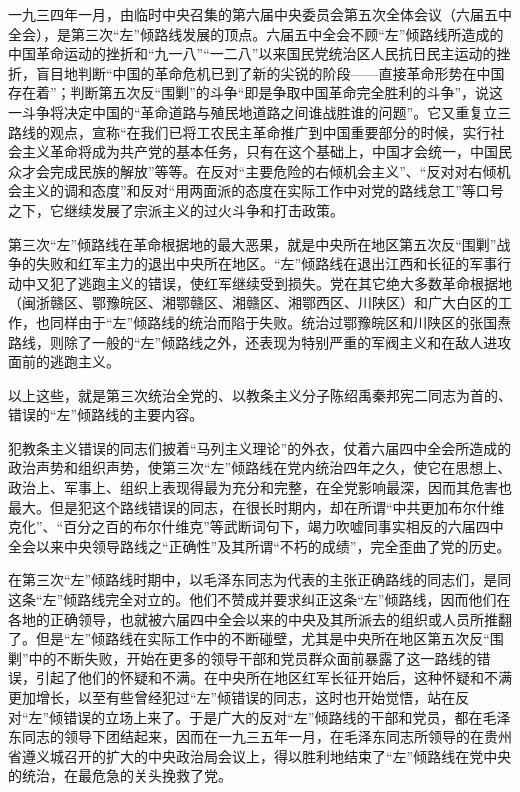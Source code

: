 一九三四年一月，由临时中央召集的第六届中央委员会第五次全体会议（六届五中全会），是第三次“左”倾路线发展的顶点。六届五中全会不顾“左”倾路线所造成的中国革命运动的挫折和“九一八”“一二八”以来国民党统治区人民抗日民主运动的挫折，盲目地判断“中国的革命危机已到了新的尖锐的阶段——直接革命形势在中国存在着”；判断第五次反“围剿”的斗争“即是争取中国革命完全胜利的斗争”，说这一斗争将决定中国的“革命道路与殖民地道路之间谁战胜谁的问题”。它又重复立三路线的观点，宣称“在我们已将工农民主革命推广到中国重要部分的时候，实行社会主义革命将成为共产党的基本任务，只有在这个基础上，中国才会统一，中国民众才会完成民族的解放”等等。在反对“主要危险的右倾机会主义”、“反对对右倾机会主义的调和态度”和反对“用两面派的态度在实际工作中对党的路线怠工”等口号之下，它继续发展了宗派主义的过火斗争和打击政策。

第三次“左”倾路线在革命根据地的最大恶果，就是中央所在地区第五次反“围剿”战争的失败和红军主力的退出中央所在地区。“左”倾路线在退出江西和长征的军事行动中又犯了逃跑主义的错误，使红军继续受到损失。党在其它绝大多数革命根据地（闽浙赣区、鄂豫皖区、湘鄂赣区、湘赣区、湘鄂西区、川陕区）和广大白区的工作，也同样由于“左”倾路线的统治而陷于失败。统治过鄂豫皖区和川陕区的张国焘路线，则除了一般的“左”倾路线之外，还表现为特别严重的军阀主义和在敌人进攻面前的逃跑主义。

以上这些，就是第三次统治全党的、以教条主义分子陈绍禹秦邦宪二同志为首的、错误的“左”倾路线的主要内容。

犯教条主义错误的同志们披着“马列主义理论”的外衣，仗着六届四中全会所造成的政治声势和组织声势，使第三次“左”倾路线在党内统治四年之久，使它在思想上、政治上、军事上、组织上表现得最为充分和完整，在全党影响最深，因而其危害也最大。但是犯这个路线错误的同志，在很长时期内，却在所谓“中共更加布尔什维克化”、“百分之百的布尔什维克”等武断词句下，竭力吹嘘同事实相反的六届四中全会以来中央领导路线之“正确性”及其所谓“不朽的成绩”，完全歪曲了党的历史。

在第三次“左”倾路线时期中，以毛泽东同志为代表的主张正确路线的同志们，是同这条“左”倾路线完全对立的。他们不赞成并要求纠正这条“左”倾路线，因而他们在各地的正确领导，也就被六届四中全会以来的中央及其所派去的组织或人员所推翻了。但是“左”倾路线在实际工作中的不断碰壁，尤其是中央所在地区第五次反“围剿”中的不断失败，开始在更多的领导干部和党员群众面前暴露了这一路线的错误，引起了他们的怀疑和不满。在中央所在地区红军长征开始后，这种怀疑和不满更加增长，以至有些曾经犯过“左”倾错误的同志，这时也开始觉悟，站在反对“左”倾错误的立场上来了。于是广大的反对“左”倾路线的干部和党员，都在毛泽东同志的领导下团结起来，因而在一九三五年一月，在毛泽东同志所领导的在贵州省遵义城召开的扩大的中央政治局会议上，得以胜利地结束了“左”倾路线在党中央的统治，在最危急的关头挽救了党。

